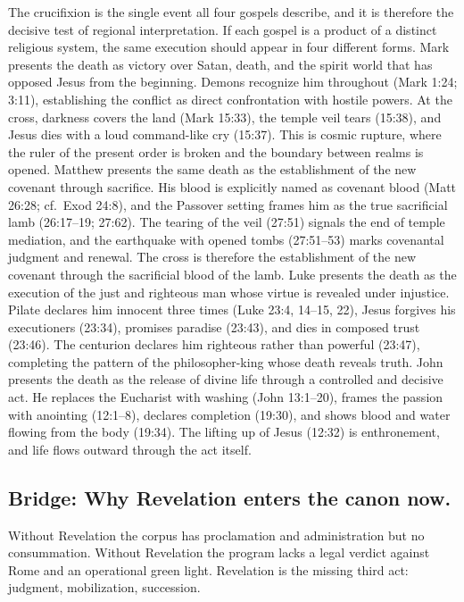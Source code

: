 The crucifixion is the single event all four gospels describe, and it is therefore the decisive test of regional interpretation.
If each gospel is a product of a distinct religious system, the same execution should appear in four different forms.
Mark presents the death as victory over Satan, death, and the spirit world that has opposed Jesus from the beginning.
Demons recognize him throughout (Mark 1:24; 3:11), establishing the conflict as direct confrontation with hostile powers.
At the cross, darkness covers the land (Mark 15:33), the temple veil tears (15:38), and Jesus dies with a loud command-like cry (15:37).
This is cosmic rupture, where the ruler of the present order is broken and the boundary between realms is opened.
Matthew presents the same death as the establishment of the new covenant through sacrifice.
His blood is explicitly named as covenant blood (Matt 26:28; cf.\ Exod 24:8), and the Passover setting frames him as the true sacrificial lamb (26:17--19; 27:62).
The tearing of the veil (27:51) signals the end of temple mediation, and the earthquake with opened tombs (27:51--53) marks covenantal judgment and renewal.
The cross is therefore the establishment of the new covenant through the sacrificial blood of the lamb.
Luke presents the death as the execution of the just and righteous man whose virtue is revealed under injustice.
Pilate declares him innocent three times (Luke 23:4, 14--15, 22), Jesus forgives his executioners (23:34), promises paradise (23:43), and dies in composed trust (23:46).
The centurion declares him righteous rather than powerful (23:47), completing the pattern of the philosopher-king whose death reveals truth.
John presents the death as the release of divine life through a controlled and decisive act.
He replaces the Eucharist with washing (John 13:1--20), frames the passion with anointing (12:1--8), declares completion (19:30), and shows blood and water flowing from the body (19:34).
The lifting up of Jesus (12:32) is enthronement, and life flows outward through the act itself.
\subsection{Bridge: Why Revelation enters the canon now.}\label{subsec:bridge-why-revelation-enters-the-canon-now}
Without Revelation the corpus has proclamation and administration but no consummation.
Without Revelation the program lacks a legal verdict against Rome and an operational green light.
Revelation is the missing third act: judgment, mobilization, succession.

